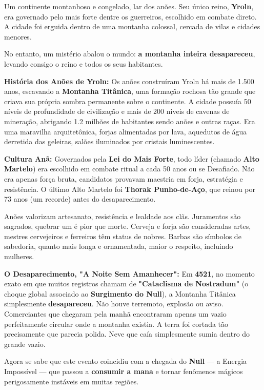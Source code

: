 Um continente montanhoso e congelado, lar dos anões. Seu único reino, \textbf{Yroln}, era governado pelo mais forte dentre os guerreiros, escolhido em combate direto. A cidade foi erguida dentro de uma montanha colossal, cercada de vilas e cidades menores.

No entanto, um mistério abalou o mundo: \textbf{a montanha inteira desapareceu}, levando consigo o reino e todos os seus habitantes.

\textbf{\ringmfamily História dos Anões de Yroln:}
Os anões construíram Yroln há mais de 1.500 anos, escavando a \textbf{Montanha Titânica}, uma formação rochosa tão grande que criava sua própria sombra permanente sobre o continente. A cidade possuía 50 níveis de profundidade de civilização e mais de 200 niveis de cavenas de mineração, abrigando 1.2 milhões de habitantes sendo anões e outras raças. Era uma maravilha arquitetônica, forjas alimentadas por lava, aquedutos de água derretida das geleiras, salões iluminados por cristais luminescentes.

\textbf{\ringmfamily Cultura Anã:} Governados pela \textbf{Lei do Mais Forte}, todo líder (chamado \textbf{Alto Martelo}) era escolhido em combate ritual a cada 50 anos ou se Desafiado. Não era apenas força bruta, candidatos provavam maestria em forja, estratégia e resistência. O último Alto Martelo foi \textbf{Thorak Punho-de-Aço}, que reinou por 73 anos (um recorde) antes do desaparecimento.

Anões valorizam artesanato, resistência e lealdade aos clãs. Juramentos são sagrados, quebrar um é pior que morte. Cerveja e forja são consideradas artes, mestres cervejeiros e ferreiros têm status de nobres. Barbas são símbolos de sabedoria, quanto mais longa e ornamentada, maior o respeito, incluindo mulheres.

\textbf{\ringmfamily O Desaparecimento, "A Noite Sem Amanhecer":}
Em \textbf{4521}, no momento exato em que muitos registros chamam de \textbf{"Cataclisma de Nostradum"} (o choque global associado ao \textbf{Surgimento do Null}), a Montanha Titânica simplesmente \textbf{desapareceu}. Não houve terremoto, explosão ou aviso. Comerciantes que chegaram pela manhã encontraram apenas um vazio perfeitamente circular onde a montanha existia. A terra foi cortada tão precisamente que parecia polida. Neve que caía simplesmente sumia dentro do grande vazio.

Agora se sabe que este evento coincidiu com a chegada do \textbf{Null} — a Energia Impossível — que passou a \textbf{consumir a mana } e tornar fenômenos mágicos perigosamente instáveis em muitas regiões.

